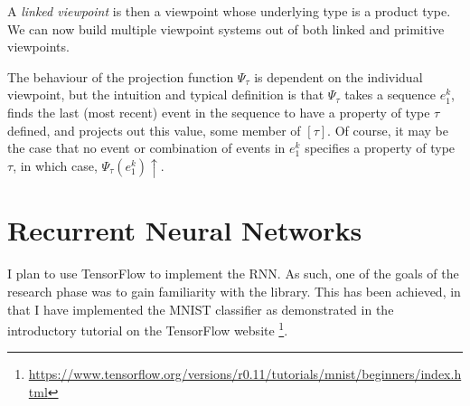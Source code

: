 \documentclass[12pt,a4paper,twoside]{article}
\begin{document}
A \emph{linked viewpoint} is then a viewpoint whose underlying type is a product
type. We can now build multiple viewpoint systems out of both linked and
primitive viewpoints. 

The behaviour of the projection function $\Psi_\tau$ is dependent on the
individual viewpoint, but the intuition and typical definition is that
$\Psi_\tau$ takes a sequence $e_1^k$, finds the last (most recent) event in the
sequence to have a property of type $\tau$ defined, and projects out this value,
some member of $[\tau]$. Of course, it may be the case that no event or
combination of events in $e_1^k$ specifies a property of type $\tau$, in which
case, $\Psi_\tau(e_1^k)\uparrow$.

\section*{Recurrent Neural Networks}

I plan to use TensorFlow to implement the RNN. As such, one of the goals of the
research phase was to gain familiarity with the library. This has been achieved,
in that I have implemented the MNIST classifier as demonstrated in the
introductory tutorial on the TensorFlow website
\footnote{\url{https://www.tensorflow.org/versions/r0.11/tutorials/mnist/beginners/index.html}}.



\printbibliography
\end{document}
